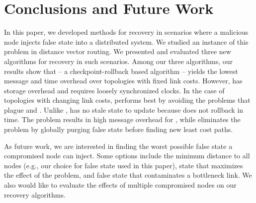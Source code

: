 \section{Conclusions and Future Work}
\label{sec:future}

In this paper, we developed methods for recovery in scenarios where a malicious node injects false state into a distributed system.  
We studied an instance of this problem in distance vector routing.
We presented and evaluated three new algorithms for recovery in such scenarios. %
Among our three algorithms, our results show that \cpr -- a checkpoint-rollback based algorithm -- yields the lowest message and time overhead over topologies
with fixed link costs.  However, \cpr has storage overhead and requires loosely synchronized clocks.
In the case of topologies with changing link costs, \purge performs best by avoiding the problems that plague \cpr and \seconds.
Unlike \cprs, \purge has no stale state to update because \purge does not rollback in time.  
The \infinity problem results in high message overhead for \seconds, while \purge eliminates the \infinity problem by globally purging false state before finding new least cost paths.

As future work, we are interested in finding the worst possible false state a compromised node can inject.  Some options include the minimum distance to all nodes (e.g., 
our choice for false state used in this paper), state that maximizes the effect of the \infinity problem, and false state that contaminates a bottleneck link. 
We also would like to evaluate the effects of multiple compromised nodes on our recovery algorithms. 

